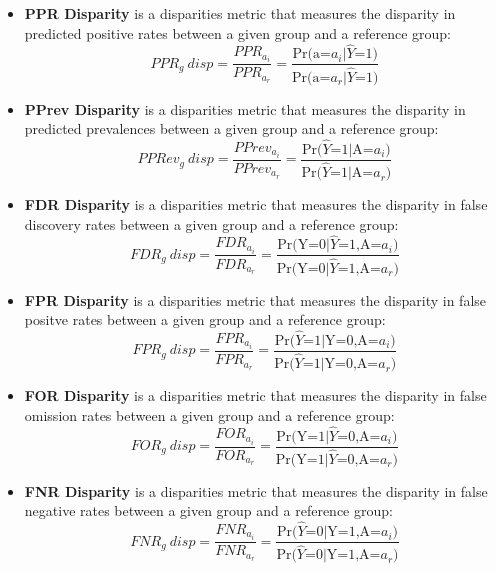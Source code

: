 \iffalse
\begin{itemize}
\item [-] \textbf{PPR Disparity} is a disparities metric that measures the disparity in predicted positive rates between a given group and a reference group:
\begin{equation}
 PPR_g \ disp = \frac{PPR_{a_i}}{PPR_{a_r}} = \frac{\text{Pr(a=}a_i|\widehat{Y}\text{=1)}}{\text{Pr(a=}a_r|\widehat{Y}\text{=1)}}
\end{equation}
\item [-] \textbf{PPrev Disparity} is a disparities metric that measures the disparity in predicted prevalences between a given group and a reference group:
\begin{equation}
PPRev_g \ disp = \frac{PPrev_{a_i}}{PPrev_{a_r}} = \frac{\text{Pr(}\widehat{Y}\text{=1|A=}a_i)}{\text{Pr(}\widehat{Y}\text{=1|A=}a_r)}
\end{equation}
\item [-] \textbf{FDR Disparity} is a disparities metric that measures the disparity in false discovery rates between a given group and a reference group:
\begin{equation}
FDR_g \ disp = \frac{FDR_{a_i}}{FDR_{a_r}} = \frac{\text{Pr(Y=0|}\widehat{Y}\text{=1,A=}a_i)}{\text{Pr(Y=0|}\widehat{Y}\text{=1,A=}a_r)}
\end{equation}
\item [-] \textbf{FPR Disparity} is a disparities metric that measures the disparity in false positve rates between a given group and a reference group:
\begin{equation}
FPR_g \ disp = \frac{FPR_{a_i}}{FPR_{a_r}} = \frac{\text{Pr(}\widehat{Y}\text{=1|Y=0,A=}a_i) }{\text{Pr(}\widehat{Y}\text{=1|Y=0,A=}a_r) }
\end{equation}
\item [-] \textbf{FOR Disparity} is a disparities metric that measures the disparity in false omission rates between a given group and a reference group:
\begin{equation}
FOR_g \ disp = \frac{FOR_{a_i}}{FOR_{a_r}} = \frac{\text{Pr(Y=1|}\widehat{Y}\text{=0,A=}a_i)}{\text{Pr(Y=1|}\widehat{Y}\text{=0,A=}a_r)}
\end{equation}
\item [-] \textbf{FNR Disparity} is a disparities metric that measures the disparity in false negative rates between a given group and a reference group:
\begin{equation}
FNR_g \ disp = \frac{FNR_{a_i}}{FNR_{a_r}} = \frac{\text{Pr(}\widehat{Y}\text{=0|Y=1,A=}a_i)}{\text{Pr(}\widehat{Y}\text{=0|Y=1,A=}a_r)}
\end{equation}
\end{itemize}

